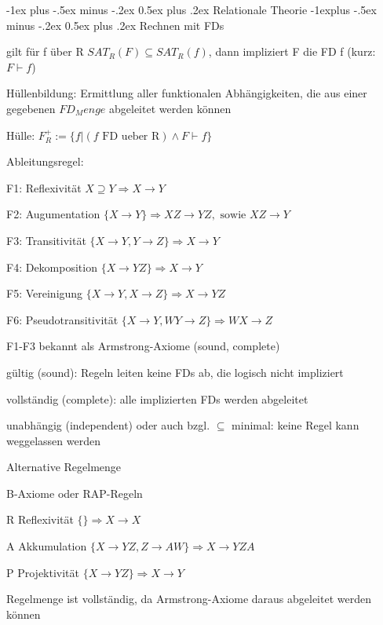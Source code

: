 \documentclass[a4paper]{article}
\makeatletter
\renewcommand{\section}{\@startsection{section}{1}{0mm}%
                                {-1ex plus -.5ex minus -.2ex}%
                                {0.5ex plus .2ex}%
                                {\normalfont\large\bfseries}}
\renewcommand{\subsection}{\@startsection{subsection}{2}{0mm}%
                                {-1explus -.5ex minus -.2ex}%
                                {0.5ex plus .2ex}%
                                {\normalfont\normalsize\bfseries}}
\makeatother
\begin{document}
\begin{multicols}{3}
\section{Relationale Theorie}
\subsection{Rechnen mit FDs}
\begin{itemize*}
    \item gilt für f über R $SAT_R(F)\subseteq SAT_R(f)$, dann impliziert F die FD f (kurz: $F\vdash f$)
    \item Hüllenbildung: Ermittlung aller funktionalen Abhängigkeiten, die aus einer gegebenen $FD_Menge$ abgeleitet werden können
    \item Hülle: $F_R^+ := \{ f | (f \text{ FD ueber R} ) \wedge F \vdash f\}$
\end{itemize*}

Ableitungsregel:
\begin{itemize*}
    \item F1: Reflexivität $X\supseteq Y \Rightarrow X\rightarrow Y$
    \item F2: Augumentation $\{X\rightarrow Y\}\Rightarrow XZ\rightarrow YZ, \text{ sowie } XZ\rightarrow Y$
    \item F3: Transitivität $\{ X\rightarrow Y,Y\rightarrow Z\}\Rightarrow X\rightarrow Y$
    \item F4: Dekomposition $\{X\rightarrow YZ\} \Rightarrow X\rightarrow Y$
    \item F5: Vereinigung $\{X\rightarrow Y, X\rightarrow Z\}\Rightarrow X\rightarrow YZ$
    \item F6: Pseudotransitivität $\{X\rightarrow Y, WY\rightarrow Z\}\Rightarrow WX\rightarrow Z$
\end{itemize*}

F1-F3 bekannt als Armstrong-Axiome (sound, complete)
\begin{itemize*}
    \item gültig (sound): Regeln leiten keine FDs ab, die logisch nicht impliziert
    \item vollständig (complete): alle implizierten FDs werden abgeleitet
    \item unabhängig (independent) oder  auch bzgl. $\subseteq$ minimal: keine Regel kann weggelassen werden
\end{itemize*}

Alternative Regelmenge
\begin{itemize*}
    \item B-Axiome oder RAP-Regeln
    \begin{itemize*}
        \item R Reflexivität $\{\}\Rightarrow X\rightarrow X$
        \item A Akkumulation $\{X\rightarrow YZ, Z\rightarrow AW\}\Rightarrow X\rightarrow YZA$
        \item P Projektivität $\{X\rightarrow YZ\}\Rightarrow X\rightarrow Y$
    \end{itemize*}
    \item Regelmenge ist vollständig, da Armstrong-Axiome daraus abgeleitet werden können
\end{itemize*}


\end{multicols}
\end{document}

